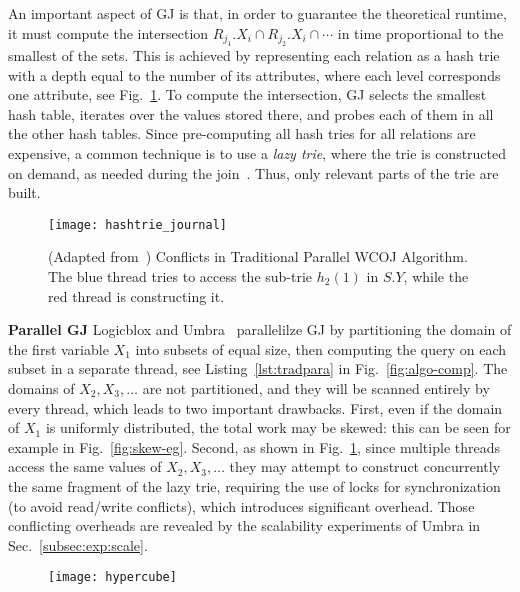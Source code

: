 An important aspect of GJ is that, in order to guarantee the
theoretical runtime, it must compute the intersection
$R_{j_1}.X_i \cap R_{j_2}.X_i\cap \cdots$ in time proportional to the
smallest of the sets.  This is achieved by representing each relation
as a hash trie with a depth equal to the number of its attributes,
where each level corresponds one attribute, see
Fig.~\ref{fig:hashtrie}.  To compute the intersection, GJ selects the
smallest hash table, iterates over the values stored there, and probes
each of them in all the other hash tables.  Since pre-computing all
hash tries for all relations are expensive, a common technique is to
use a \emph{lazy trie}, where the trie is constructed on demand, as
needed during the
join~\cite{DBLP:journals/pvldb/FreitagBSKN20,DBLP:journals/pacmmod/WangWS23}.
Thus, only relevant parts of the trie are built.

\begin{figure}[t]
	\texttt{[image: hashtrie\_journal]}
	
	\caption{(Adapted from~\cite[Fig.6]{umbratechreport})
          Conflicts in Traditional Parallel WCOJ Algorithm. The blue
          thread tries to access the sub-trie $h_2(1)$ in $S.Y$, while
          the red thread is constructing it. }
  \label{fig:hashtrie}
\end{figure}

\addvspace{\smallskipamount}
\noindent\textbf{Parallel GJ} Logicblox\cite{DBLP:conf/sigmod/ArefCGKOPVW15}
and Umbra~\cite{DBLP:journals/pvldb/FreitagBSKN20} parallelilze GJ by
partitioning the domain of the first variable $X_1$ into subsets of
equal size, then computing the query on each subset in a separate
thread, see Listing~\ref{lst:tradpara} in Fig.~\ref{fig:algo-comp}.  The domains of
$X_2, X_3, \ldots$ are not partitioned, and they will be scanned
entirely by every thread, which leads to two important drawbacks.
First, even if the domain of $X_1$ is uniformly distributed, the total
work may be skewed: this can be seen for example in
Fig.~\ref{fig:skew-eg}.  Second, as shown in Fig.~\ref{fig:hashtrie}, since multiple threads access the
same values of $X_2, X_3, \ldots$ they may attempt to construct
concurrently the same fragment of the lazy trie, requiring the use of
locks for synchronization (to avoid read/write conflicts), which
introduces significant overhead. Those conflicting overheads are revealed by the scalability experiments of Umbra in Sec.~\ref{subsec:exp:scale}.

\begin{figure}[t]
	\texttt{[image: hypercube]}
	\caption{}
  \label{fig:hc}
\end{figure}

